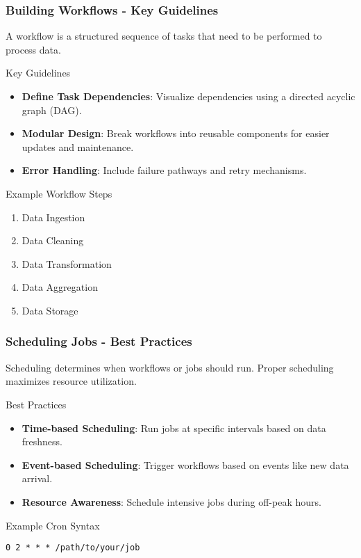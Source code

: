 \documentclass[aspectratio=169]{beamer}
\begin{document}
\begin{frame}[fragile]
    \frametitle{Building Workflows - Key Guidelines}
    A workflow is a structured sequence of tasks that need to be performed to process data.
    
    \begin{block}{Key Guidelines}
        \begin{itemize}
            \item \textbf{Define Task Dependencies}: Visualize dependencies using a directed acyclic graph (DAG).
            \item \textbf{Modular Design}: Break workflows into reusable components for easier updates and maintenance.
            \item \textbf{Error Handling}: Include failure pathways and retry mechanisms.
        \end{itemize}
    \end{block}

    \begin{block}{Example Workflow Steps}
        \begin{enumerate}
            \item Data Ingestion
            \item Data Cleaning
            \item Data Transformation
            \item Data Aggregation
            \item Data Storage
        \end{enumerate}
    \end{block}
\end{frame}

\begin{frame}[fragile]
    \frametitle{Scheduling Jobs - Best Practices}
    Scheduling determines when workflows or jobs should run. Proper scheduling maximizes resource utilization.

    \begin{block}{Best Practices}
        \begin{itemize}
            \item \textbf{Time-based Scheduling}: Run jobs at specific intervals based on data freshness.
            \item \textbf{Event-based Scheduling}: Trigger workflows based on events like new data arrival.
            \item \textbf{Resource Awareness}: Schedule intensive jobs during off-peak hours.
        \end{itemize}
    \end{block}

    \begin{block}{Example Cron Syntax}
        \begin{lstlisting}
0 2 * * * /path/to/your/job
        \end{lstlisting}
    \end{block}
\end{frame}
\end{document}

